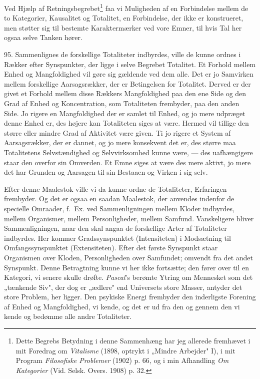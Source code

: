 \documentclass[12pt,a4paper]{book}
\newcommand{\apage}[1]{\marginnote{\footnotesize\textit{[#1]}}}
\begin{document}
Ved Hjælp af Retningsbegrebet\footnote{Dette Begrebs Betydning i denne Sammenhæng
har jeg allerede fremhævet i mit Foredrag om \emph{Vitalisme} (1898, optrykt i
„Mindre Arbejder" I), i mit Program \emph{Filosofiske Problemer} (1902) p. 66, og i
min Afhandling \emph{Om Kategorier} (Vid. Selsk. Overs. 1908) p. 32.} faa vi
Muligheden af en Forbindelse mellem de to Kategorier, Kausalitet og Totalitet, en
Forbindelse, der ikke er konstrueret, men støtter sig til bestemte Karaktermærker
ved vore Emner, til hvis Tal her ogsaa selve Tanken hører.

95. Sammenlignes de forskellige Totaliteter indbyrdes, ville de kunne ordnes i
Rækker efter Synspunkter, der ligge i selve Begrebet Totalitet. Et Forhold mellem
Enhed og Mangfoldighed vil gøre sig gældende ved dem alle. Det er jo Samvirken
mellem forskellige Aarsagsrækker, der er \apage{223} Betingelsen for Totalitet. Derved er der
givet et Forhold mellem disse Rækkers Mangfoldighed paa den ene Side og den Grad af
Enhed og Koncentration, som Totaliteten frembyder, paa den anden Side. Jo rigere en
Mangfoldighed der er samlet til Enhed, og jo mere udpræget denne Enhed er, des
højere kan Totaliteten siges at være. Hermed vil tillige den større eller mindre
Grad af Aktivitet være given. Ti jo rigere et System af Aarsagsrækker, der er
dannet, og jo mere konsekvent det er, des større maa Totalitetens Selvstændighed og
Selvvirksomhed kunne være, --- des uafhængigere staar den overfor sin Omverden. Et
Emne siges at være des mere aktivt, jo mere det har Grunden og Aarsagen til sin
Bestaaen og Virken i sig selv.

Efter denne Maalestok ville vi da kunne ordne de Totaliteter, Erfaringen frembyder.
Og det er ogsaa en saadan Maalestok, der anvendes indenfor de specielle Omraader,
f.\ Ex. ved Sammenligningen mellem Kloder indbyrdes, mellem Organismer, mellem
Personligheder, mellem Samfund. Vanskeligere bliver Sammenligningen, naar den skal
angaa de forskellige Arter af Totaliteter indbyrdes. Her kommer Gradssynspunktet
(Intensiteten) i Modsætning til Omfangssynspunktet (Extensiteten). Efter det første
Synspunkt staar Organismen over Kloden, Personligheden over Samfundet; omvendt fra
det andet Synspunkt. Denne Betragtning kunne vi her ikke fortsætte; den fører over
til en Kategori, vi senere skulle drøfte. \emph{Pascal}'s berømte Ytring om
Mennesket som det „tænkende Siv", der dog er „ædlere" end Universets store Masser,
antyder det store Problem, her ligger. Den psykiske Energi frembyder den
inderligste Forening af Enhed og Mangfoldighed, vi kende, og det er ud fra den og
gennem den vi kende og bedømme alle andre Totaliteter.
\end{document}

